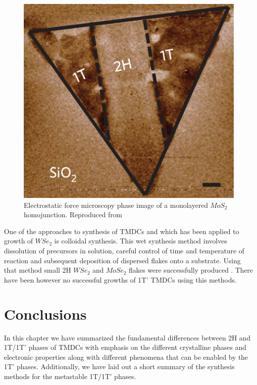 \begin{figure}[!h]
	\begin{center}
		\includegraphics[scale=0.25]{1T'/Homojunction.png}
		\caption{Electrostatic force microscopy phase image of a monolayered $MoS_2$ homojunction. Reproduced from \cite{Kappera2014}}
		\label{fig:1T'Homojunction}
	\end{center}
\end{figure}

One of the approaches to synthesis of TMDCs and which has been applied to growth of $WSe_2$ is colloidal synthesis. This wet synthesis method involves dissolution of precursors in solution, careful control of time and temperature of reaction and subsequent deposition of dispersed flakes onto a substrate. Using that method small 2H $WSe_2$ and $MoSe_2$ flakes were successfully produced \cite{Barrera2017}\cite{Jung2015}. There have been however no successful growths of 1T' TMDCs using this methods.

\section{Conclusions}

In this chapter we have summarized the fundamental differences between 2H and 1T/1T’ phases of TMDCs with emphasis on the different crystalline phases and electronic properties along with different phenomena that can be enabled by the 1T’ phases. Additionally, we have laid out a short summary of the synthesis methods for the metastable 1T/1T’ phases.